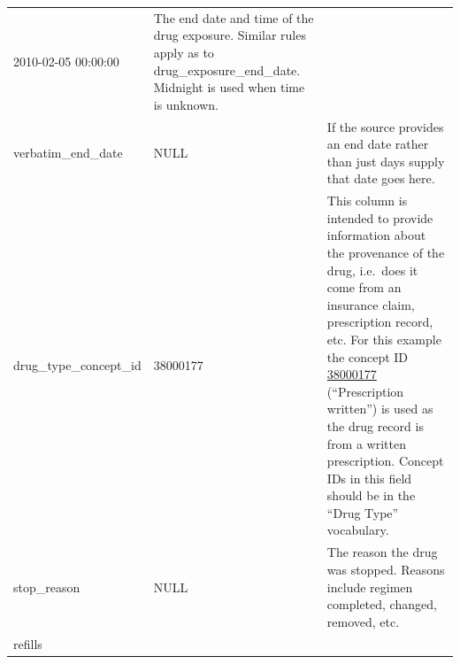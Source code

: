 \documentclass[11pt]{book}
\theoremstyle{definition}
\theoremstyle{definition}
\theoremstyle{definition}
\theoremstyle{remark}
\begin{document}
\begin{longtable}[]{@{}lll@{}}
\begin{minipage}[t]{0.15\columnwidth}
2010-02-05 00:00:00\strut
\end{minipage} & \begin{minipage}[t]{0.49\columnwidth}\raggedright
The end date and time of the drug exposure. Similar rules apply as to drug\_exposure\_end\_date. Midnight is used when time is unknown.\strut
\end{minipage}\tabularnewline
\begin{minipage}[t]{0.28\columnwidth}\raggedright
verbatim\_end\_date\strut
\end{minipage} & \begin{minipage}[t]{0.15\columnwidth}\raggedright
NULL\strut
\end{minipage} & \begin{minipage}[t]{0.49\columnwidth}\raggedright
If the source provides an end date rather than just days supply that date goes here.\strut
\end{minipage}\tabularnewline
\begin{minipage}[t]{0.28\columnwidth}\raggedright
drug\_type\_concept\_id\strut
\end{minipage} & \begin{minipage}[t]{0.15\columnwidth}\raggedright
38000177\strut
\end{minipage} & \begin{minipage}[t]{0.49\columnwidth}\raggedright
This column is intended to provide information about the provenance of the drug, i.e.~does it come from an insurance claim, prescription record, etc. For this example the concept ID \href{http://athena.ohdsi.org/search-terms/terms/38000177}{38000177} (``Prescription written'') is used as the drug record is from a written prescription. Concept IDs in this field should be in the ``Drug Type'' vocabulary.\strut
\end{minipage}\tabularnewline
\begin{minipage}[t]{0.28\columnwidth}\raggedright
stop\_reason\strut
\end{minipage} & \begin{minipage}[t]{0.15\columnwidth}\raggedright
NULL\strut
\end{minipage} & \begin{minipage}[t]{0.49\columnwidth}\raggedright
The reason the drug was stopped. Reasons include regimen completed, changed, removed, etc.\strut
\end{minipage}\tabularnewline
\begin{minipage}[t]{0.28\columnwidth}\raggedright
refills\strut
\end{minipage} & \begin{minipage}[t]{0.15\columnwidth}\raggedright

\end{minipage}
\end{longtable}
\end{document}
